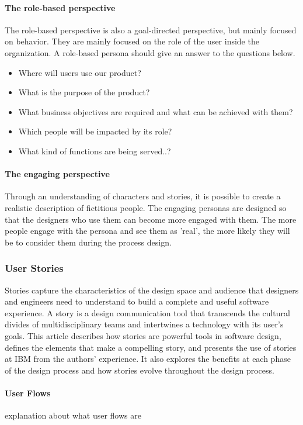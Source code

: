     \paragraph{The role-based perspective}
    The role-based perspective is also a goal-directed perspective, but mainly focused on behavior. They are mainly focused on the role of the user inside the organization. A role-based persona should give an answer to the questions below.
    \begin{itemize}
        \item{Where will users use our product?}
        \item{What is the purpose of the product?}
        \item{What business objectives are required and what can be achieved with them?}
        \item{Which people will be impacted by its role?}
        \item{What kind of functions are being served..?}
    \end{itemize}
    
    \paragraph{The engaging perspective}
    Through an understanding of characters and stories, it is possible to create a realistic description of fictitious people. The engaging personas are designed so that the designers who use them can become more engaged with them. The more people engage with the persona and see them as 'real', the more likely they will be to consider them during the process design.
    
    \subsubsection{User Stories}
    Stories capture the characteristics of the design space and audience that designers and engineers need to understand to build a complete and useful software experience. A story is a design communication tool that transcends the cultural divides of multidisciplinary teams and intertwines a technology with its user's goals. This article describes how stories are powerful tools in software design, defines the elements that make a compelling story, and presents the use of stories at IBM from the authors' experience. It also explores the benefits at each phase of the design process and how stories evolve throughout the design process.
    \paragraph{User Flows}
    explanation about what user flows are
    
